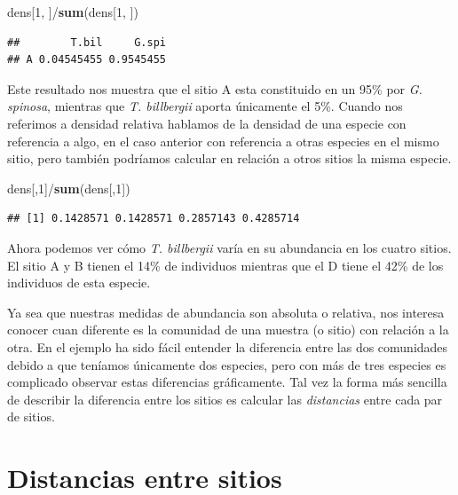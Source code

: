 \documentclass[]{book}
\newenvironment{Shaded}{\begin{snugshade}}{\end{snugshade}}
\newcommand{\KeywordTok}[1]{\textcolor[rgb]{0.13,0.29,0.53}{\textbf{{#1}}}}
\newcommand{\DecValTok}[1]{\textcolor[rgb]{0.00,0.00,0.81}{{#1}}}
\newcommand{\NormalTok}[1]{{#1}}
\begin{document}
\begin{Shaded}
\begin{Highlighting}[]
\NormalTok{dens[}\DecValTok{1}\NormalTok{, ]/}\KeywordTok{sum}\NormalTok{(dens[}\DecValTok{1}\NormalTok{, ])}
\end{Highlighting}
\end{Shaded}

\begin{verbatim}
##        T.bil     G.spi
## A 0.04545455 0.9545455
\end{verbatim}

Este resultado nos muestra que el sitio A esta constituido en un 95\%
por \emph{G. spinosa}, mientras que \emph{T. billbergii} aporta
únicamente el 5\%. Cuando nos referimos a densidad relativa hablamos de
la densidad de una especie con referencia a algo, en el caso anterior
con referencia a otras especies en el mismo sitio, pero también
podríamos calcular en relación a otros sitios la misma especie.

\begin{Shaded}
\begin{Highlighting}[]
\NormalTok{dens[,}\DecValTok{1}\NormalTok{]/}\KeywordTok{sum}\NormalTok{(dens[,}\DecValTok{1}\NormalTok{])}
\end{Highlighting}
\end{Shaded}

\begin{verbatim}
## [1] 0.1428571 0.1428571 0.2857143 0.4285714
\end{verbatim}

Ahora podemos ver cómo \emph{T. billbergii} varía en su abundancia en
los cuatro sitios. El sitio A y B tienen el 14\% de individuos mientras
que el D tiene el 42\% de los individuos de esta especie.

Ya sea que nuestras medidas de abundancia son absoluta o relativa, nos
interesa conocer cuan diferente es la comunidad de una muestra (o sitio)
con relación a la otra. En el ejemplo ha sido fácil entender la
diferencia entre las dos comunidades debido a que teníamos únicamente
dos especies, pero con más de tres especies es complicado observar estas
diferencias gráficamente. Tal vez la forma más sencilla de describir la
diferencia entre los sitios es calcular las \emph{distancias} entre cada
par de sitios.

\section{Distancias entre sitios}\label{distancias-entre-sitios}
\end{document}
